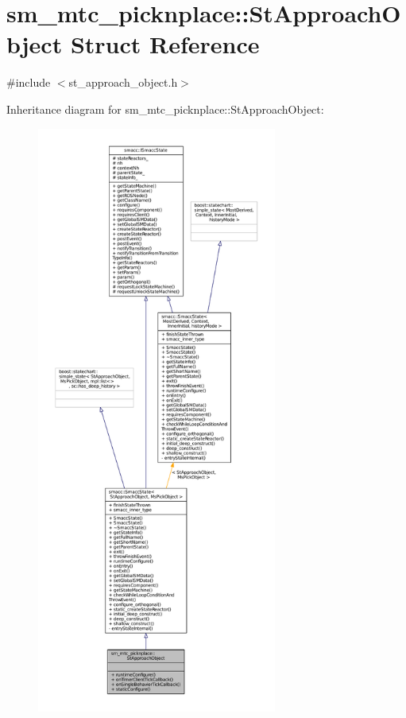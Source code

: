 \hypertarget{structsm__mtc__picknplace_1_1StApproachObject}{}\section{sm\+\_\+mtc\+\_\+picknplace\+:\+:St\+Approach\+Object Struct Reference}
\label{structsm__mtc__picknplace_1_1StApproachObject}


{\ttfamily \#include $<$st\+\_\+approach\+\_\+object.\+h$>$}



Inheritance diagram for sm\+\_\+mtc\+\_\+picknplace\+:\+:St\+Approach\+Object\+:
\nopagebreak
\begin{figure}[H]
\begin{center}
\leavevmode
\includegraphics[height=550pt]{structsm__mtc__picknplace_1_1StApproachObject__inherit__graph}
\end{center}
\end{figure}


